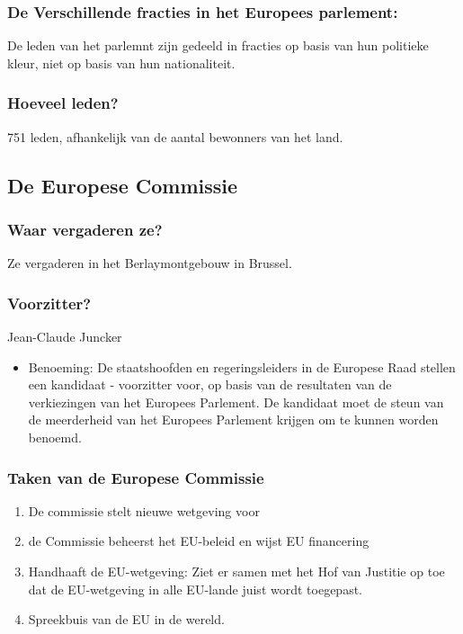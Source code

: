 \documentclass{article}
\begin{document}
        \subsubsection{De Verschillende fracties in het Europees parlement:}
        De leden van het parlemnt zijn gedeeld in fracties op basis van hun politieke kleur, niet op basis van hun nationaliteit.

    \subsubsection{Hoeveel leden?}
    751 leden, afhankelijk van de aantal bewonners van het land.
    
\subsection{De Europese Commissie}
\subsubsection{Waar vergaderen ze?}
Ze vergaderen in het Berlaymontgebouw in Brussel.
\subsubsection{Voorzitter?}
Jean-Claude Juncker
\begin{itemize}
    \item Benoeming: De staatshoofden en regeringsleiders in de Europese Raad stellen een kandidaat - voorzitter voor, op basis van de resultaten van de verkiezingen van het Europees Parlement. De kandidaat moet de steun van de meerderheid van het Europees Parlement krijgen om te kunnen worden benoemd.
\end{itemize}
\subsubsection{Taken van de Europese Commissie}
\begin{enumerate}
    \item De commissie stelt nieuwe wetgeving voor
    \item de Commissie beheerst het EU-beleid en wijst EU financering
    \item Handhaaft de EU-wetgeving: Ziet er samen met het Hof van Justitie op toe dat de EU-wetgeving in alle EU-lande juist wordt toegepast.
    \item Spreekbuis van de EU in de wereld.
\end{enumerate}
\end{document}
